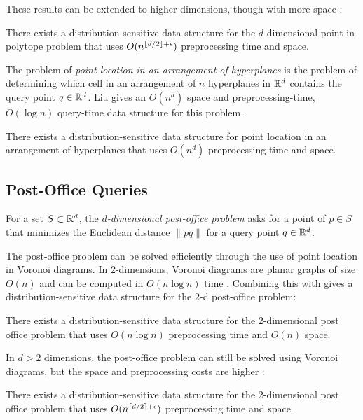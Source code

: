 \documentclass{patmorin}
\begin{document}
These results can be extended to higher dimensions, though with more
space \cite{c88}:

\begin{thm}
  There exists a distribution-sensitive data structure for
  the $d$-dimensional point in polytope problem that uses
  $O(n^{{\left\lfloor d/2 \right\rfloor}+\epsilon})$ preprocessing time and space.
\end{thm}

The problem of \emph{point-location in an arrangement of hyperplanes} is
the problem of determining which cell in an arrangement of $n$ hyperplanes
in $\mathbb{R}^d$ contains the query point $q\in\mathbb{R}^d$.  Liu gives an $O(n^d)$
space and preprocessing-time, $O(\log n)$ query-time data structure for
this problem \cite{l04}.

\begin{thm}
  There exists a distribution-sensitive data structure for point location
  in an arrangement of hyperplanes that uses $O(n^d)$ preprocessing time
  and space.
\end{thm}

\subsection{Post-Office Queries}

For a set $S\subset\mathbb{R}^d$, the \emph{$d$-dimensional post-office problem}
asks for a point of $p\in S$ that minimizes the Euclidean distance
$\|pq\|$ for a query point $q\in\mathbb{R}^d$.

The post-office problem can be solved efficiently through the use of
point location in Voronoi diagrams.  In 2-dimensions, Voronoi diagrams
are planar graphs of size $O(n)$ and can be computed in $O(n\log n)$ time
\cite{ps85}.  Combining this with  gives
a distribution-sensitive data structure for the 2-d post-office problem:

\begin{thm}
  There exists a distribution-sensitive data structure for the
  2-dimensional post office problem that uses $O(n\log n)$ preprocessing
  time and $O(n)$ space.
\end{thm}

In $d >2$ dimensions, the post-office problem can still be solved using
Voronoi diagrams, but the space and preprocessing costs are higher
\cite{c88postoffice}:

\begin{thm}
  There exists a distribution-sensitive data structure for the
  2-dimensional post office problem that uses $O(n^{{\left\lceil d/2 \right\rceil}+\epsilon})$
  preprocessing time and space.
\end{thm}
\end{document}
